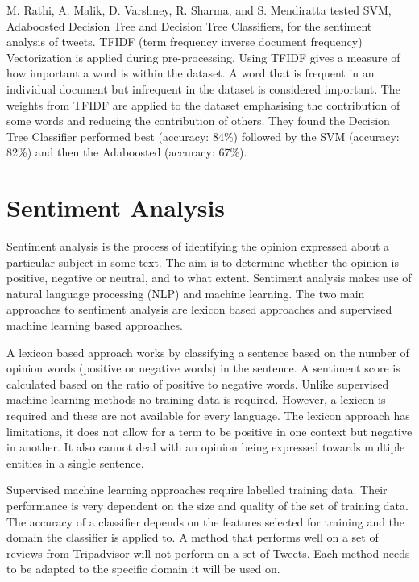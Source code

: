M. Rathi, A. Malik, D. Varshney, R. Sharma, and S. Mendiratta \cite{Raithi2018} tested SVM, Adaboosted Decision Tree and Decision Tree Classifiers, for the sentiment analysis of tweets. TFIDF (term frequency inverse document frequency) Vectorization is applied during pre-processing. Using TFIDF gives a measure of how important a word is within the dataset. A word that is frequent in an individual document but infrequent in the dataset is considered important. The weights from TFIDF are applied to the dataset emphasising the contribution of some words and reducing the contribution of others. They found the Decision Tree Classifier performed best  (accuracy: 84\%) followed by the SVM (accuracy: 82\%) and then the Adaboosted (accuracy: 67\%). 

\section{Sentiment Analysis}

Sentiment analysis is the process of identifying the opinion expressed about a particular subject in some text. The aim is to determine whether the opinion is positive, negative or neutral, and to what extent. Sentiment analysis makes use of natural language processing (NLP) and machine learning. The two main approaches to sentiment analysis are lexicon based approaches and supervised machine learning based approaches. 

A lexicon based approach works by classifying a sentence based on the number of opinion words (positive or negative words) in the sentence. A sentiment score is calculated based on the ratio of positive to negative words. Unlike supervised machine learning methods no training data is required. However, a lexicon is required and these are not available for every language. The lexicon approach has limitations, it does not allow for a term to be positive in one context but negative in another. It also cannot deal with an opinion being expressed towards multiple entities in a single sentence.

Supervised machine learning approaches require labelled training data. Their performance is very dependent on the size and quality of the set of training data. The accuracy of a classifier depends on the features selected for training and the domain the classifier is applied to. A method that performs well on a set of reviews from Tripadvisor will not perform on a set of Tweets. Each method needs to be adapted to the specific domain it will be used on.

